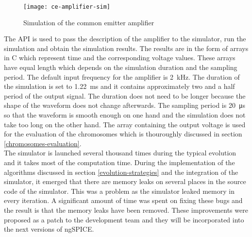 \begin{figure}[H]
    \centering
    \texttt{[image: ce-amplifier-sim]}\label{ce-amplifier-sim}
    \caption{Simulation of the common emitter amplifier}
\end{figure}

The API is used to pass the description of the amplifier to the simulator, run the simulation and obtain the simulation results. The results are in the form of arrays in C which represent time and the corresponding voltage values. These arrays have equal length which depends on the simulation duration and the sampling period. The default input frequency for the amplifier is \SI{2}{\kilo\hertz}. The duration of the simulation is set to \SI{1.22}{\milli\second} and it contains approximately two and a half period of the output signal. The duration does not need to be longer because the shape of the waveform does not change afterwards. The sampling period is \SI{20}{\micro\second} so that the waveform is smooth enough on one hand and the simulation does not take too long on the other hand. The array containing the output voltage is used for the evaluation of the chromosomes which is thouroughly discussed in section \ref{chromosomes-evaluation}.\\
The simulator is launched several thousand times during the typical evolution and it takes most of the computation time. During the implementation of the algorithms discussed in section \ref{evolution-strategies} and the integration of the simulator, it emerged that there are memory leaks on several places in the source code of the simulator. This was a problem as the simulator leaked memory in every iteration. A significant amount of time was spent on fixing these bugs and the result is that the memory leaks have been removed. These improvements were proposed as a patch to the development team and they will be incorporated into the next versions of ngSPICE.